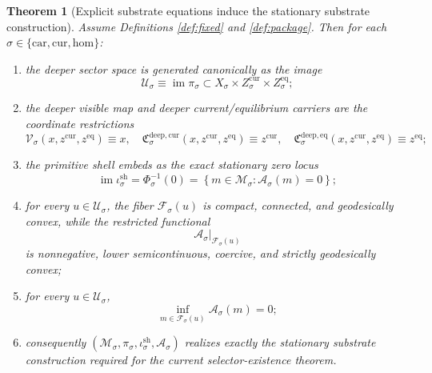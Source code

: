 \documentclass[11pt]{article}
\newcommand{\Car}{\mathrm{car}}
\newcommand{\Cur}{\mathrm{cur}}
\newcommand{\Hom}{\mathrm{hom}}
\newcommand{\SubSpace}[1]{\mathcal M_{#1}}
\newcommand{\DataProj}[1]{\pi_{#1}}
\newcommand{\ShellEquation}[1]{\Phi_{#1}}
\newcommand{\Fiber}[1]{\mathcal F_{#1}}
\newcommand{\ShellEmbed}[1]{\iota_{#1}^{\mathrm{sh}}}
\newcommand{\StationaryFunctional}[1]{\mathscr A_{#1}}
\newcommand{\DeepSpace}[1]{\mathcal U_{#1}}
\newcommand{\VisibleMap}[1]{\mathcal V_{#1}}
\newcommand{\DeepCurrentCarrier}[1]{\mathfrak C_{#1}^{\mathrm{deep,cur}}}
\newcommand{\DeepEqCarrier}[1]{\mathfrak C_{#1}^{\mathrm{deep,eq}}}
\newtheorem{theorem}{Theorem}
\begin{document}
\begin{theorem}[Explicit substrate equations induce the stationary substrate construction]
\label{thm:construction}
Assume Definitions \ref{def:fixed} and \ref{def:package}. Then for each \(\sigma\in\{\Car,\Cur,\Hom\}\):
\begin{enumerate}
    \item the deeper sector space is generated canonically as the image
    \[
    \DeepSpace{\sigma}
    \equiv
    \operatorname{im}\DataProj{\sigma}
    \subset
    X_{\sigma}\times Z_{\sigma}^{\mathrm{cur}}\times Z_{\sigma}^{\mathrm{eq}};
    \]
    \item the deeper visible map and deeper current/equilibrium carriers are the coordinate restrictions
    \begin{equation}
    \VisibleMap{\sigma}(x,z^{\mathrm{cur}},z^{\mathrm{eq}})\equiv x,
    \quad
    \DeepCurrentCarrier{\sigma}(x,z^{\mathrm{cur}},z^{\mathrm{eq}})
    \equiv z^{\mathrm{cur}},
    \quad
    \DeepEqCarrier{\sigma}(x,z^{\mathrm{cur}},z^{\mathrm{eq}})
    \equiv z^{\mathrm{eq}};
    \label{eq:deepcoords}
    \end{equation}
    \item the primitive shell embeds as the exact stationary zero locus
    \[
    \operatorname{im}\ShellEmbed{\sigma}
    =
    \ShellEquation{\sigma}^{-1}(0)
    =
    \left\{
    m\in\SubSpace{\sigma}:\StationaryFunctional{\sigma}(m)=0
    \right\};
    \]
    \item for every \(u\in\DeepSpace{\sigma}\), the fiber \(\Fiber{\sigma}(u)\) is compact, connected, and geodesically convex, while the restricted functional
    \[
    \StationaryFunctional{\sigma}\big|_{\Fiber{\sigma}(u)}
    \]
    is nonnegative, lower semicontinuous, coercive, and strictly geodesically convex;
    \item for every \(u\in\DeepSpace{\sigma}\),
    \begin{equation}
    \inf_{m\in\Fiber{\sigma}(u)}
    \StationaryFunctional{\sigma}(m)=0;
    \label{eq:zeroinf}
    \end{equation}
    \item consequently \((\SubSpace{\sigma},\DataProj{\sigma},\ShellEmbed{\sigma},\StationaryFunctional{\sigma})\) realizes exactly the stationary substrate construction required for the current selector-existence theorem.
\end{enumerate}
\end{theorem}
\end{document}
